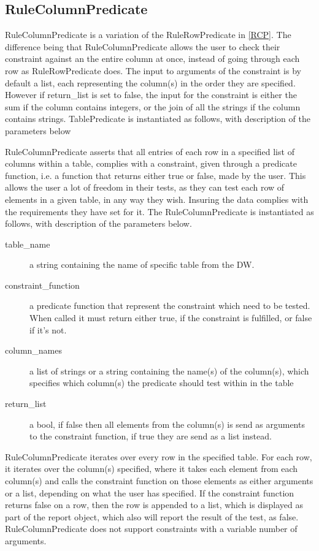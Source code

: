 \subsection{RuleColumnPredicate}
RuleColumnPredicate is a variation of the RuleRowPredicate in \cref{RCP}. The difference being that RuleColumnPredicate allows the user to check their constraint against an the entire column at once, instead of going through each row as RuleRowPredicate does. The input to arguments of the constraint is by default a list, each representing the column(s) in the order they are specified. However if return\_list is set to false, the input for the constraint is either the sum if the column contains integers, or the join of all the strings if the column contains strings. TablePredicate is instantiated as follows, with description of the parameters below

RuleColumnPredicate asserts that all entries of each row in a specified list of columns within a table, complies with a constraint, given through a predicate function, i.e. a function that returns either true or false, made by the user. This allows the user a lot of freedom in their tests, as they can test each row of elements in a given table, in any way they wish. Insuring the data complies with the requirements they have set for it. The RuleColumnPredicate is instantiated as follows, with description of the parameters below.


\begin{description}
\item [table\_name] a string containing the name of specific table from the DW. 
\item [constraint\_function] a predicate function that represent the constraint which need to be tested. When called it must return either true, if the constraint is fulfilled, or false if it's not.
\item [column\_names] a list of strings or a string containing the name(s) of the column(s), which specifies which column(s) the predicate should test within in the table
\item [return\_list] a bool, if false then all elements from the column(s) is send as arguments to the constraint function, if true they are send as a list instead.
\end{description}

RuleColumnPredicate iterates over every row in the specified table. For each row, it iterates over the column(s) specified, where it takes each element from each column(s) and calls the constraint function on those elements as either arguments or a list, depending on what the user has specified. If the constraint function returns false on a row, then the row is appended to a list, which is displayed as part of the report object, which also will report the result of the test, as false. RuleColumnPredicate does not support constraints with a variable number of arguments.
